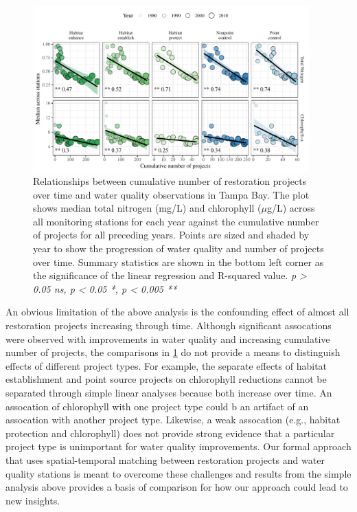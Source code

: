 \documentclass[]{article}
\begin{document}
\begin{figure}
\centerline{\includegraphics[width = 0.95\textwidth]{figs/cumprj.pdf}}
\caption{Relationships between cumulative number of restoration projects over time and water quality observations in Tampa Bay. The plot shows median total nitrogen (mg/L) and chlorophyll ($\mu$g/L) across all monitoring stations for each year against the cumulative number of projects for all preceding years.  Points are sized and shaded by year to show the progression of water quality and number of projects over time.  Summary statistics are shown in the bottom left corner as the significance of the linear regression and R-squared value. \textit{p > 0.05 ns, p < 0.05 *, p < 0.005 **}}
\label{fig:cumprj}
\end{figure}

An obvious limitation of the above analysis is the confounding effect of
almost all restoration projects increasing through time. Although
significant assocations were observed with improvements in water quality
and increasing cumulative number of projects, the comparisons in
\cref{fig:cumprj} do not provide a means to distinguish effects of
different project types. For example, the separate effects of habitat
establishment and point source projects on chlorophyll reductions cannot
be separated through simple linear analyses because both increase over
time. An assocation of chlorophyll with one project type could b an
artifact of an assocation with another project type. Likewise, a weak
assocation (e.g., habitat protection and chlorophyll) does not provide
strong evidence that a particular project type is unimportant for water
quality improvements. Our formal approach that uses spatial-temporal
matching between restoration projects and water quality stations is
meant to overcome these challenges and results from the simple analysis
above provides a basis of comparison for how our approach could lead to
new insights.
\end{document}
